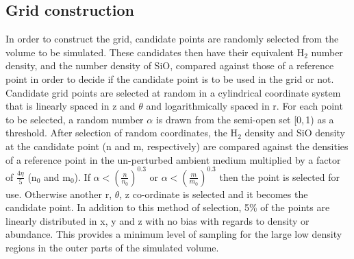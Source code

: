 \documentclass[useAMS,usenatbib]{mn2e}
\begin{document}
\subsection{Grid construction} \label{subsec:gridding}
In order to construct the grid, candidate points are randomly selected from the volume to be simulated. These candidates then have their equivalent H$_2$ number density, and the number density of SiO, compared against those of a reference point in order to decide if the candidate point is to be used in the grid or not. Candidate grid points are selected at random in a cylindrical coordinate system that is linearly spaced in z and $\theta$ and logarithmically spaced in r. For each point to be selected, a random number $\alpha$ is drawn from the semi-open set [0,$\,$1) as a threshold. After selection of random coordinates, the H$_2$ density and SiO density at the candidate point (n and m, respectively) are compared against the densities of a reference point in the un-perturbed ambient medium multiplied by a factor of $\frac{4\eta}{5}$ (n$_0$ and m$_0$). If $\alpha<\left( \frac{n}{n_0} \right)^{0.3}$ or $\alpha< \left( \frac{m}{m_0} \right)^{0.3}$ then the point is selected for use. Otherwise another r, $\theta$, z co-ordinate is selected and it becomes the candidate point. In addition to this method of selection, 5\% of the points are linearly distributed in x, y and z with no bias with regards to density or abundance. This provides a minimum level of sampling for the large low density regions in the outer parts of the simulated volume. %
\end{document}
